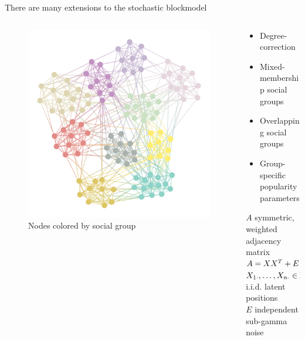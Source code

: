 \documentclass[aspectratio=169]{beamer}
\theoremstyle{remark}
\begin{document}
\begin{frame}{There are many extensions to the stochastic blockmodel}
    \begin{columns}
        \begin{column}{0.4\textwidth}
            \begin{figure}
                \centering
                \includegraphics[width=\textwidth]{./figures/assortative.png}
                \footnotesize
                \caption*{Nodes colored by social group}
            \end{figure}
        \end{column}
        \begin{column}{0.6\textwidth}
            \begin{itemize}
                \item Degree-correction
                \item Mixed-membership social groups
                \item Overlapping social groups
                \item Group-specific popularity parameters
            \end{itemize}
            \vspace{4mm}
            \begin{definition}
                $A$ symmetric, weighted adjacency matrix \\
                $A = X X^T + E$ \\
                $X_{1 \cdot}, \dots, X_{n \cdot} \in \mathbb{R}^{1 \times d}$ i.i.d. latent positions \\
                $E$ independent sub-gamma noise
            \end{definition}
        \end{column}
    \end{columns}
\end{frame}
\end{document}
